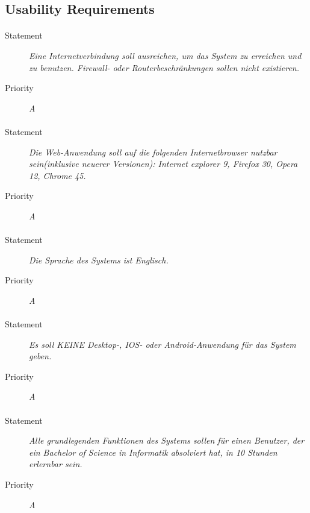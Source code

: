\subsection{Usability Requirements}


\paragraph{}
\begin{description}
\item[Statement] \textit{Eine Internetverbindung soll ausreichen, um das System zu erreichen und zu benutzen. Firewall- oder Routerbeschränkungen sollen nicht existieren.}
\item[Priority] \textit{A}
\end{description}

\paragraph{}
\begin{description}
\item[Statement] \textit{Die Web-Anwendung soll auf die folgenden Internetbrowser nutzbar sein(inklusive neuerer Versionen): Internet explorer 9, Firefox 30, Opera 12, Chrome 45.}
\item[Priority] \textit{A}
\end{description}

\paragraph{}
\begin{description}
\item[Statement] \textit{Die Sprache des Systems ist Englisch.}
\item[Priority] \textit{A}
\end{description}

\paragraph{}
\begin{description}
\item[Statement] \textit{Es soll KEINE Desktop-, IOS- oder Android-Anwendung für das System geben.}
\item[Priority] \textit{A}
\end{description}

\paragraph{}
\begin{description}
\item[Statement] \textit{Alle grundlegenden Funktionen des Systems sollen für einen Benutzer, der ein Bachelor of Science in Informatik absolviert hat, in 10 Stunden erlernbar sein.}
\item[Priority] \textit{A}
\end{description}


